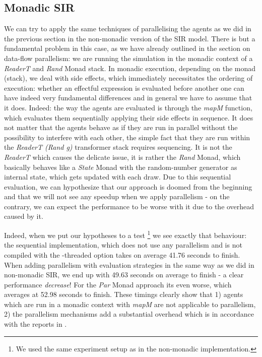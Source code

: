 \subsection{Monadic SIR}
We can try to apply the same techniques of parallelising the agents as we did in the previous section in the non-monadic version of the SIR model. There is but a fundamental problem in this case, as we have already outlined in the section on data-flow parallelism: we are running the simulation in the monadic context of a \textit{ReaderT} and \textit{Rand} Monad stack. In monadic execution, depending on the monad (stack), we deal with side effects, which immediately necessitates the ordering of execution: whether an effectful expression is evaluated before another one can have indeed very fundamental differences and in general we have to assume that it does.
Indeed: the way the agents are evaluated is through the \textit{mapM} function, which evaluates them sequentially applying their side effects in sequence. It does not matter that the agents behave as if they are run in parallel without the possibility to interfere with each other, the simple fact that they are run within the \textit{ReaderT (Rand g)} transformer stack requires sequencing. It is not the \textit{ReaderT} which causes the delicate issue, it is rather the \textit{Rand} Monad, which basically behaves like a \textit{State} Monad with the random-number generator as internal state, which gets updated with each draw.
Due to this sequential evaluation, we can hypothesize that our approach is doomed from the beginning and that we will not see any speedup  when we apply parallelism - on the contrary, we can expect the performance to be worse with it due to the overhead caused by it.

Indeed, when we put our hypotheses to a test \footnote{We used the same experiment setup as in the non-monadic implementation.} we see exactly that behaviour: the sequential implementation, which does not use any parallelism and is not compiled with the -threaded option takes on average 41.76 seconds to finish. When adding parallelism with evaluation strategies in the same way as we did in non-monadic SIR, we end up with 49.63 seconds on average to finish - a clear performance \textit{decrease}! For the \textit{Par} Monad approach its even worse, which averages at 52.98 seconds to finish. These timings clearly show that 1) agents which are run in a monadic context with \textit{mapM} are not applicable to parallelism, 2) the parallelism mechanisms add a substantial overhead which is in accordance with the reports in \cite{marlow_parallel_2013}.

